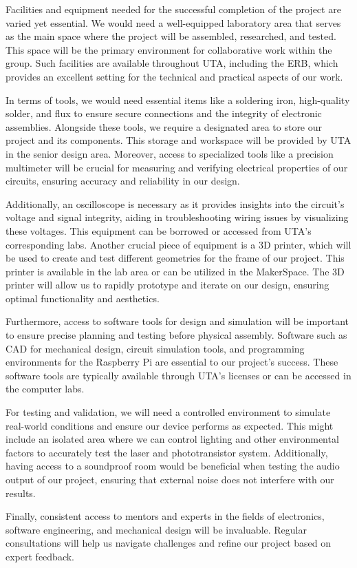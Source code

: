 Facilities and equipment needed for the successful completion of the project are varied yet essential. We would need a well-equipped laboratory area that serves as the main space where the project will be assembled, researched, and tested. This space will be the primary environment for collaborative work within the group. Such facilities are available throughout UTA, including the ERB, which provides an excellent setting for the technical and practical aspects of our work.

In terms of tools, we would need essential items like a soldering iron, high-quality solder, and flux to ensure secure connections and the integrity of electronic assemblies. Alongside these tools, we require a designated area to store our project and its components. This storage and workspace will be provided by UTA in the senior design area. Moreover, access to specialized tools like a precision multimeter will be crucial for measuring and verifying electrical properties of our circuits, ensuring accuracy and reliability in our design.

Additionally, an oscilloscope is necessary as it provides insights into the circuit's voltage and signal integrity, aiding in troubleshooting wiring issues by visualizing these voltages. This equipment can be borrowed or accessed from UTA's corresponding labs. Another crucial piece of equipment is a 3D printer, which will be used to create and test different geometries for the frame of our project. This printer is available in the lab area or can be utilized in the MakerSpace. The 3D printer will allow us to rapidly prototype and iterate on our design, ensuring optimal functionality and aesthetics.

Furthermore, access to software tools for design and simulation will be important to ensure precise planning and testing before physical assembly. Software such as CAD for mechanical design, circuit simulation tools, and programming environments for the Raspberry Pi are essential to our project's success. These software tools are typically available through UTA's licenses or can be accessed in the computer labs.

For testing and validation, we will need a controlled environment to simulate real-world conditions and ensure our device performs as expected. This might include an isolated area where we can control lighting and other environmental factors to accurately test the laser and phototransistor system. Additionally, having access to a soundproof room would be beneficial when testing the audio output of our project, ensuring that external noise does not interfere with our results.

Finally, consistent access to mentors and experts in the fields of electronics, software engineering, and mechanical design will be invaluable. Regular consultations will help us navigate challenges and refine our project based on expert feedback.
